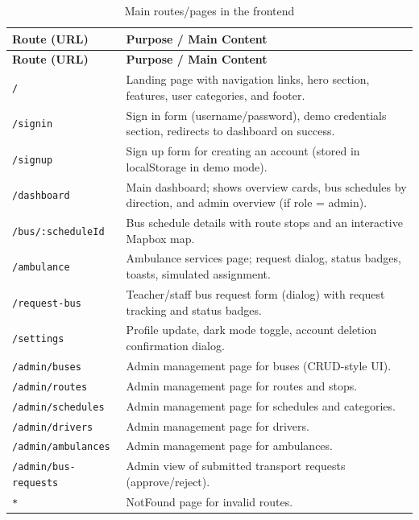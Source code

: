 \documentclass[12pt,a4paper]{report}
\begin{document}
\begin{longtable}{p{4cm}p{10.5cm}}
\caption{Main routes/pages in the frontend}\label{tab:routes}\\
\toprule
\textbf{Route (URL)} & \textbf{Purpose / Main Content}\\
\midrule
\endfirsthead
\toprule
\textbf{Route (URL)} & \textbf{Purpose / Main Content}\\
\midrule
\endhead
\bottomrule
\endfoot

\texttt{/} & Landing page with navigation links, hero section, features, user categories, and footer.\\
\texttt{/signin} & Sign in form (username/password), demo credentials section, redirects to dashboard on success.\\
\texttt{/signup} & Sign up form for creating an account (stored in localStorage in demo mode).\\
\texttt{/dashboard} & Main dashboard; shows overview cards, bus schedules by direction, and admin overview (if role = admin).\\
\texttt{/bus/:scheduleId} & Bus schedule details with route stops and an interactive Mapbox map.\\
\texttt{/ambulance} & Ambulance services page; request dialog, status badges, toasts, simulated assignment.\\
\texttt{/request-bus} & Teacher/staff bus request form (dialog) with request tracking and status badges.\\
\texttt{/settings} & Profile update, dark mode toggle, account deletion confirmation dialog.\\
\texttt{/admin/buses} & Admin management page for buses (CRUD-style UI).\\
\texttt{/admin/routes} & Admin management page for routes and stops.\\
\texttt{/admin/schedules} & Admin management page for schedules and categories.\\
\texttt{/admin/drivers} & Admin management page for drivers.\\
\texttt{/admin/ambulances} & Admin management page for ambulances.\\
\texttt{/admin/bus-requests} & Admin view of submitted transport requests (approve/reject).\\
\texttt{*} & NotFound page for invalid routes.\\
\end{longtable}
\end{document}
